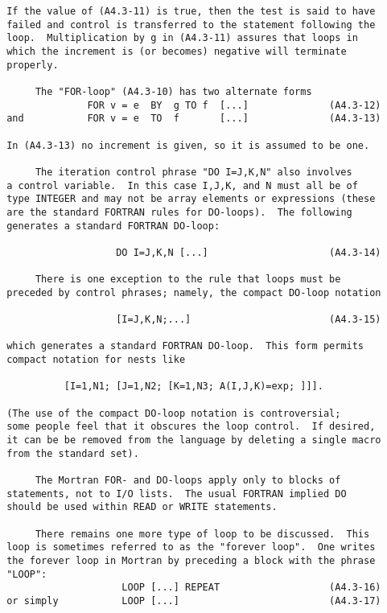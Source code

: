 \newpage \begin{verbatim}
 If the value of (A4.3-11) is true, then the test is said to have
 failed and control is transferred to the statement following the
 loop.  Multiplication by g in (A4.3-11) assures that loops in
 which the increment is (or becomes) negative will terminate
 properly.
 
      The "FOR-loop" (A4.3-10) has two alternate forms
               FOR v = e  BY  g TO f  [...]              (A4.3-12)
 and           FOR v = e  TO  f       [...]              (A4.3-13)
 
 In (A4.3-13) no increment is given, so it is assumed to be one.
 
      The iteration control phrase "DO I=J,K,N" also involves
 a control variable.  In this case I,J,K, and N must all be of
 type INTEGER and may not be array elements or expressions (these
 are the standard FORTRAN rules for DO-loops).  The following
 generates a standard FORTRAN DO-loop:
 
                    DO I=J,K,N [...]                     (A4.3-14)
 
      There is one exception to the rule that loops must be
 preceded by control phrases; namely, the compact DO-loop notation
 
                    [I=J,K,N;...]                        (A4.3-15)
 
 which generates a standard FORTRAN DO-loop.  This form permits
 compact notation for nests like
 
           [I=1,N1; [J=1,N2; [K=1,N3; A(I,J,K)=exp; ]]].
 
 (The use of the compact DO-loop notation is controversial;
 some people feel that it obscures the loop control.  If desired,
 it can be be removed from the language by deleting a single macro
 from the standard set).
 
      The Mortran FOR- and DO-loops apply only to blocks of
 statements, not to I/O lists.  The usual FORTRAN implied DO
 should be used within READ or WRITE statements.
 
      There remains one more type of loop to be discussed.  This
 loop is sometimes referred to as the "forever loop".  One writes
 the forever loop in Mortran by preceding a block with the phrase
 "LOOP":
                     LOOP [...] REPEAT                   (A4.3-16)
 or simply           LOOP [...]                          (A4.3-17)
\end{verbatim} 
